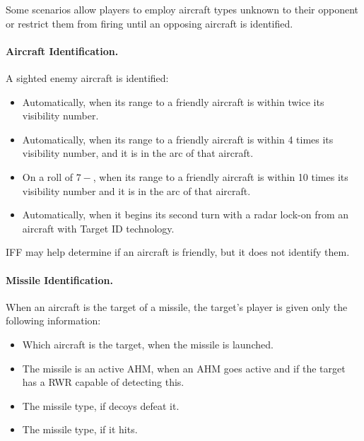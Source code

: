 \begin{advancedrules}
{Some scenarios allow players to employ aircraft types unknown to their opponent or restrict them from firing until an opposing aircraft is identified.

\paragraph{Aircraft Identification.} A sighted enemy aircraft is identified:

\begin{itemize}

    \item Automatically, when its range to a friendly aircraft is within twice its visibility number.

    \item Automatically, when its range to a friendly aircraft is within 4 times its visibility number, and it is in the  arc of that aircraft.

    \item On a roll of $7-$, when its range to a friendly aircraft is within 10 times its visibility number and it is in the  arc of that aircraft.

    \item Automatically, when it begins its second turn with a radar lock-on from an aircraft with Target ID technology.

\end{itemize}

IFF may help determine if an aircraft is friendly, but it does not identify them.

\paragraph{Missile Identification.} 
When an aircraft is the target of a missile, the target's player is given only the following information:


\begin{itemize}
    \item Which aircraft is the target, when the missile is launched.
    \item The missile is an active AHM, when an AHM goes active and if the target has a RWR capable of detecting this.
    \item The missile type, if decoys defeat it.
    \item The missile type, if it hits.
\end{itemize}

}
\end{advancedrules}
